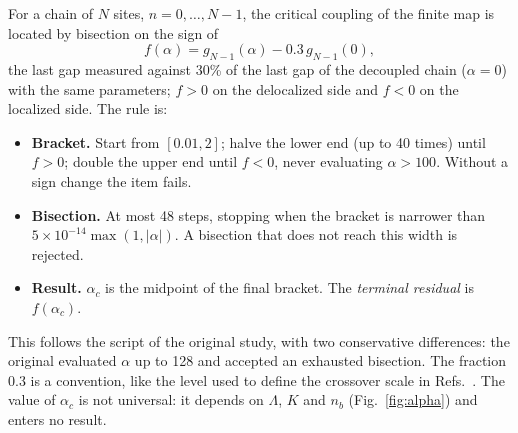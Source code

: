 \documentclass[10pt,a4paper]{article}
\begin{document}
For a chain of $N$ sites, $n=0,\dots,N-1$, the critical coupling of the finite map is located by bisection on the sign of
\begin{equation}
f(\alpha)=g_{N-1}(\alpha)-0.3\,g_{N-1}(0),\label{eq:bisect}
\end{equation}
the last gap measured against 30\% of the last gap of the decoupled chain ($\alpha=0$) with the same parameters; $f>0$ on the
delocalized side and $f<0$ on the localized side. The rule is:
\begin{itemize}
\item \textbf{Bracket.} Start from $[0.01,2]$; halve the lower end (up to 40 times) until $f>0$; double the upper end until $f<0$,
  never evaluating $\alpha>100$. Without a sign change the item fails.
\item \textbf{Bisection.} At most 48 steps, stopping when the bracket is narrower than $5\times10^{-14}\max(1,|\alpha|)$. A bisection
  that does not reach this width is rejected.
\item \textbf{Result.} $\alpha_c$ is the midpoint of the final bracket. The \emph{terminal residual} is $f(\alpha_c)$.
\end{itemize}
This follows the script of the original study, with two conservative differences: the original evaluated $\alpha$ up to 128 and
accepted an exhausted bisection. The fraction 0.3 is a convention, like the level used to define the crossover
scale in Refs.~\cite{Bulla2003,Bulla2005}. The value of $\alpha_c$ is not universal: it depends on $\Lambda$, $K$ and $n_b$
(Fig.~\ref{fig:alpha}) and enters no result.
\end{document}
